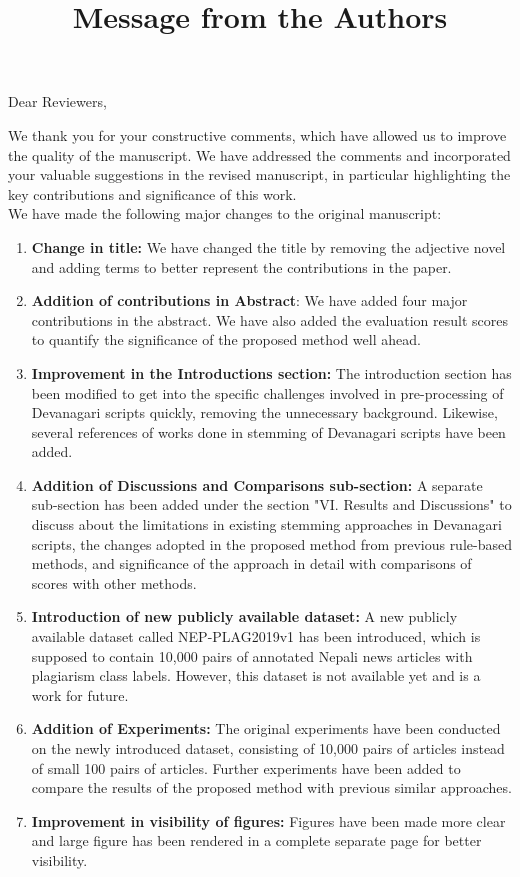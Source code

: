 \title{Message from the Authors}
\vskip 0.2in

\noindent Dear Reviewers,

\vskip 0.1in

\noindent We thank you for your constructive comments, which have allowed us 
to improve the quality of the manuscript. We have addressed the comments and 
incorporated your valuable suggestions in the revised manuscript, in particular 
highlighting the key contributions and significance of this work.\\ 

\noindent We have made the following major changes to the original manuscript:

\begin{enumerate}
  \item \textbf{Change in title:}
    We have changed the title by removing the adjective
    novel and adding terms to better represent the contributions in the paper.
  \item \textbf{Addition of contributions in Abstract}:
    We have added four major
    contributions in the abstract. We have also added the evaluation result
    scores to quantify the significance of the proposed method well ahead.
  \item \textbf{Improvement in the Introductions section:}
    The introduction section has been modified to get into the specific
    challenges involved in pre-processing of Devanagari scripts quickly,
    removing the unnecessary background. Likewise, several references of works 
    done in stemming of Devanagari scripts have been added. 
  \item \textbf{Addition of Discussions and Comparisons sub-section:}
    A separate sub-section has been added under the section "VI. Results and
    Discussions" to discuss about the limitations in existing stemming
    approaches in Devanagari scripts, the changes adopted in the proposed method
    from previous rule-based methods, and significance of the approach in detail with
    comparisons of scores with other methods.
  \item \textbf{Introduction of new publicly available dataset:}
    A new publicly available dataset called NEP-PLAG2019v1 has been introduced,
    which is supposed to contain 10,000 pairs of annotated Nepali news articles
    with plagiarism class labels. However, this dataset is not available yet and
    is a work for future. 
  \item \textbf{Addition of Experiments:}
    The original experiments have been conducted on the newly introduced
    dataset, consisting of 10,000 pairs of articles
    instead of small 100 pairs of articles. Further experiments have been added
    to compare the results of the proposed method with previous similar
    approaches.
  \item \textbf{Improvement in visibility of figures:}
    Figures have been made more clear and large figure has been rendered in a
    complete separate page for better visibility.
\end{enumerate}

